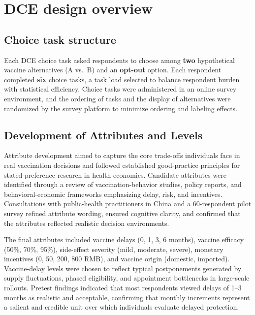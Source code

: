 \documentclass[doublespacing]{utdthesis}
\begin{document}
\section{DCE design overview}

\subsection{Choice task structure}
Each DCE choice task asked respondents to choose among \textbf{two} hypothetical vaccine alternatives (A vs.\ B) and an \textbf{opt-out} option. Each respondent completed \textbf{six} choice tasks, a task load selected to balance respondent burden with statistical efficiency. Choice tasks were administered in an online survey environment, and the ordering of tasks and the display of alternatives were randomized by the survey platform to minimize ordering and labeling effects. 

\subsection{Development of Attributes and Levels}
\label{subsec:attr_level_dev}

Attribute development aimed to capture the core trade-offs individuals face in real vaccination decisions and followed established good-practice principles for stated-preference research in health economics. Candidate attributes were identified through a review of vaccination-behavior studies, policy reports, and behavioral-economic frameworks emphasizing delay, risk, and incentives. Consultations with public-health practitioners in China and a 60-respondent pilot survey refined attribute wording, ensured cognitive clarity, and confirmed that the attributes reflected realistic decision environments.



The final attributes included vaccine delays (0, 1, 3, 6 months), vaccine efficacy (50\%, 70\%, 95\%), side-effect severity (mild, moderate, severe), monetary incentives (0, 50, 200, 800 RMB), and vaccine origin (domestic, imported). Vaccine-delay levels were chosen to reflect typical postponements generated by supply fluctuations, phased eligibility, and appointment bottlenecks in large-scale rollouts. Pretest findings indicated that most respondents viewed delays of 1--3 months as realistic and acceptable, confirming that monthly increments represent a salient and credible unit over which individuals evaluate delayed protection.
\end{document}
